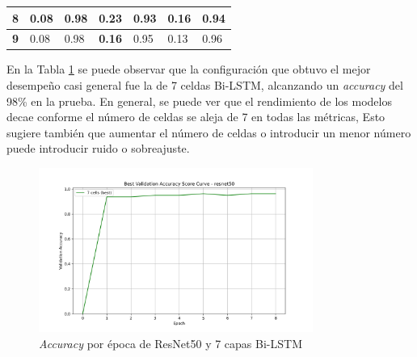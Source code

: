 \begin{table}[h!]
\begin{tabular}{|l|l|l|l|l|l|l|}
\textbf{8}                                                         & 0.08                                                                      & 0.98                                                                       & 0.23                                                                   & 0.93                                                                    & 0.16                                                               & 0.94                                                                \\ \hline
\textbf{9}                                                         & 0.08                                                                      & 0.98                                                                       & \textbf{0.16}                                                          & 0.95                                                                    & 0.13                                                               & 0.96                                                                \\   \hline
\end{tabular}
\label{table:ResNet50}
\end{table}


En la Tabla \ref{table:ResNet50} se puede observar 
que la configuración que obtuvo el mejor desempeño casi general fue 
la de 7 celdas Bi-LSTM, alcanzando un \textit{accuracy} del 98\% 
en la prueba. En general, se puede ver que el rendimiento de los modelos 
decae conforme el número de celdas se aleja de 7 en todas las métricas, 
Esto sugiere también que aumentar el número de celdas o introducir 
un menor número puede introducir ruido o sobreajuste.

\begin{figure}[h!] 
    \includegraphics[width=0.8\textwidth]{../graphs/resnet50_best_val_accuracy.png} 
    \centering 
    \caption{\textit{Accuracy} por época de ResNet50 y 7 capas Bi-LSTM } 
    \label{ResNet50Accuracy} 
\end{figure}

